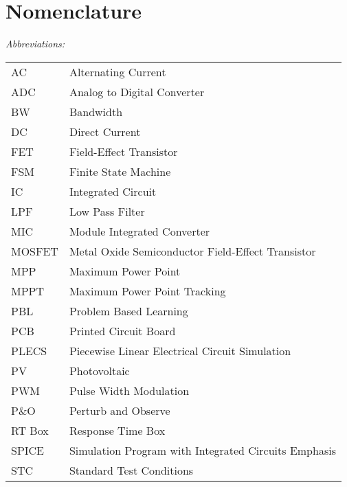 \chapter*{Nomenclature}

\vspace{-10mm} %
\textit{Abbreviations:}\newline
\begin{tabular}{ll} %
AC & Alternating Current\\
ADC & Analog to Digital Converter \\
BW & Bandwidth \\
DC & Direct Current\\
FET & Field-Effect Transistor\\
FSM & Finite State Machine \\
IC & Integrated Circuit\\
LPF & Low Pass Filter\\
MIC & Module Integrated Converter\\
MOSFET & Metal Oxide Semiconductor Field-Effect Transistor\\
MPP & Maximum Power Point\\
MPPT & Maximum Power Point Tracking\\
PBL & Problem Based Learning\\
PCB & Printed Circuit Board\\
PLECS & Piecewise Linear Electrical Circuit Simulation\\
PV & Photovoltaic\\
PWM & Pulse Width Modulation\\
P\&O & Perturb and Observe\\
RT Box & Response Time Box \\
SPICE & Simulation Program with Integrated Circuits Emphasis \\
STC & Standard Test Conditions\\
\end{tabular}

